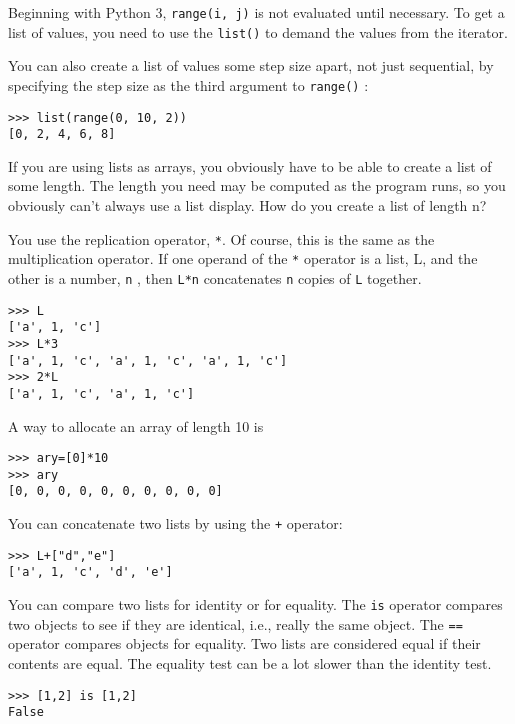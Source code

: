 Beginning with Python 3, \texttt{range(i, j)} is not evaluated until necessary.
To get a list of values, you need to use the \texttt{list()} to demand
the values from the iterator.


You can also create a list of
values some step size apart, not just sequential, by specifying the step
size as the third argument to \texttt{range()} :

\begin{verbatim}
>>> list(range(0, 10, 2))
[0, 2, 4, 6, 8]
\end{verbatim}

If you are using lists as arrays,
you obviously have to be able to create a list of some length. The
length you need may be computed as the program runs, so you obviously
can't always use a list display. How do you create a list of length n?

You use the replication operator,
\texttt{*}. Of course, this is the same as the multiplication operator.
If one operand of the \texttt{*} operator is a list, L, and the other is a
number, \texttt{n} , then \texttt{L*n} concatenates \texttt{n} copies of
\texttt{L} together.


\begin{verbatim}
>>> L
['a', 1, 'c']
>>> L*3
['a', 1, 'c', 'a', 1, 'c', 'a', 1, 'c']
>>> 2*L
['a', 1, 'c', 'a', 1, 'c']
\end{verbatim}


A way to allocate an array of length 10 is

\begin{verbatim}
>>> ary=[0]*10
>>> ary
[0, 0, 0, 0, 0, 0, 0, 0, 0, 0]
\end{verbatim}

You can concatenate two lists by
using the \texttt{+} operator:

\begin{verbatim}
>>> L+["d","e"]
['a', 1, 'c', 'd', 'e']
\end{verbatim}

You can compare two lists for
identity or for equality. The \texttt{is} operator compares two objects to
see if they are identical, i.e., really the same object. The \texttt{==}
operator compares objects for equality. Two lists are considered equal
if their contents are equal. The equality test can be a lot slower than
the identity test.

\begin{verbatim}
>>> [1,2] is [1,2]
False
\end{verbatim}

